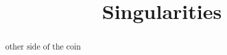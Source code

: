 \documentclass{ximera}
\title{Singularities}
\begin{document}
\begin{abstract}
other side of the coin
\end{abstract}
\maketitle
\end{document}
